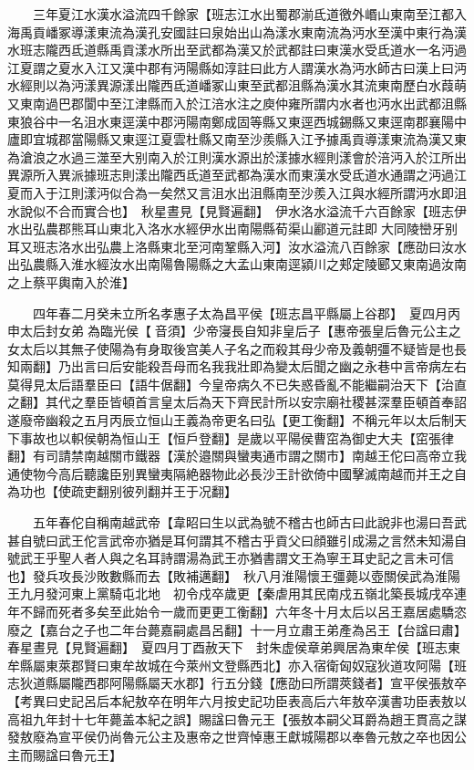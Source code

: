 　　三年夏江水漢水溢流四千餘家【班志江水出蜀郡湔氐道徼外㟭山東南至江都入海禹貢嶓冢導漾東流為漢孔安國註曰泉始出山為漾水東南流為沔水至漢中東行為漢水班志隴西氐道縣禹貢漾水所出至武都為漢又於武都註曰東漢水受氐道水一名沔過江夏謂之夏水入江又漢中郡有沔陽縣如淳註曰此方人謂漢水為沔水師古曰漢上曰沔水經則以為沔漾異源漾出隴西氐道嶓冢山東至武都沮縣為漢水其流東南歷白水葭萌又東南過巴郡閬中至江津縣而入於江涪水注之庾仲雍所謂内水者也沔水出武都沮縣東狼谷中一名沮水東逕漢中郡沔陽南鄭成固等縣又東逕西城錫縣又東逕南郡襄陽中廬即宜城郡當陽縣又東逕江夏雲杜縣又南至沙羨縣入江予據禹貢導漾東流為漢又東為滄浪之水過三澨至大别南入於江則漢水源出於漾據水經則漾會於涪沔入於江所出異源所入異派據班志則漾出隴西氐道至武都為漢水而東漢水受氐道水通謂之沔過江夏而入于江則漾沔似合為一矣然又言沮水出沮縣南至沙羨入江與水經所謂沔水即沮水說似不合而實合也】　秋星晝見【見賢遍翻】　伊水洛水溢流千六百餘家【班志伊水出弘農郡熊耳山東北入洛水水經伊水出南陽縣荀渠山酈道元註即大同陵巒牙别耳又班志洛水出弘農上洛縣東北至河南鞏縣入河】汝水溢流八百餘家【應劭曰汝水出弘農縣入淮水經汝水出南陽魯陽縣之大孟山東南逕潁川之郏定陵郾又東南過汝南之上蔡平輿南入於淮】

　　四年春二月癸未立所名孝惠子太為昌平侯【班志昌平縣屬上谷郡】　夏四月丙申太后封女弟為臨光侯【音須】少帝寖長自知非皇后子【惠帝張皇后魯元公主之女太后以其無子使陽為有身取後宫美人子名之而殺其母少帝及義朝彊不疑皆是也長知兩翻】乃出言曰后安能殺吾母而名我我壯即為變太后聞之幽之永巷中言帝病左右莫得見太后語羣臣曰【語牛倨翻】今皇帝病久不已失惑昏亂不能繼嗣治天下【治直之翻】其代之羣臣皆頓首言皇太后為天下齊民計所以安宗廟社稷甚深羣臣頓首奉詔遂廢帝幽殺之五月丙辰立恒山王義為帝更名曰弘【更工衡翻】不稱元年以太后制天下事故也以軹侯朝為恒山王【恒戶登翻】是歲以平陽侯曹窋為御史大夫【窋張律翻】有司請禁南越關市鐵器【漢於邉關與蠻夷通市謂之關市】南越王佗曰高帝立我通使物今高后聽讒臣别異蠻夷隔絶器物此必長沙王計欲倚中國擊滅南越而并王之自為功也【使疏吏翻别彼列翻并王于况翻】

　　五年春佗自稱南越武帝【韋眧曰生以武為號不稽古也師古曰此說非也湯曰吾武甚自號曰武王佗言武帝亦猶是耳何謂其不稽古乎貢父曰顔雖引成湯之言然未知湯自號武王乎聖人者人與之名耳詩謂湯為武王亦猶書謂文王為寧王耳史記之言未可信也】發兵攻長沙敗數縣而去【敗補邁翻】　秋八月淮陽懷王彊薨以壺關侯武為淮陽王九月發河東上黨騎屯北地　初令戍卒歲更【秦虐用其民南戍五嶺北築長城戌卒連年不歸而死者多矣至此始令一歲而更更工衡翻】六年冬十月太后以呂王嘉居處驕恣廢之【嘉台之子也二年台薨嘉嗣處昌呂翻】十一月立肅王弟產為呂王【台諡曰肅】　春星晝見【見賢遍翻】　夏四月丁酉赦天下　封朱虚侯章弟興居為東牟侯【班志東牟縣屬東萊郡賢曰東牟故城在今萊州文登縣西北】亦入宿衛匈奴寇狄道攻阿陽【班志狄道縣屬隴西郡阿陽縣屬天水郡】行五分錢【應劭曰所謂莢錢者】宣平侯張敖卒　【考異曰史記呂后本紀敖卒在明年六月按史記功臣表高后六年敖卒漢書功臣表敖以高祖九年封十七年薨盖本紀之誤】賜諡曰魯元王【張敖本嗣父耳爵為趙王貫高之謀發敖廢為宣平侯仍尚魯元公主及惠帝之世齊悼惠王獻城陽郡以奉魯元敖之卒也因公主而賜諡曰魯元王】

